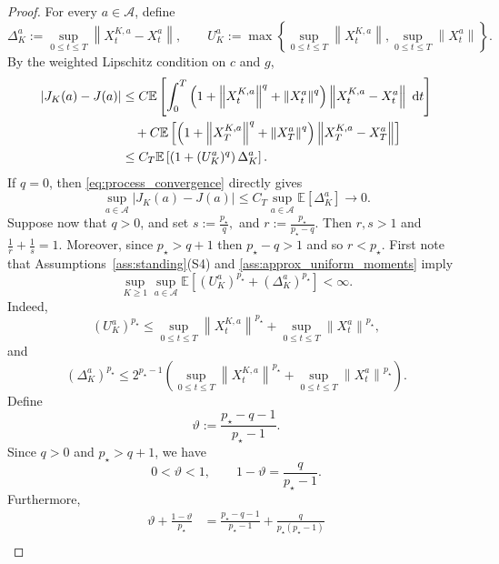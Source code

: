 \documentclass[11pt]{article}
\theoremstyle{remarkitalic}
\theoremstyle{remarkitalic}
\newcommand{\E}{\mathbb E}
\newcommand{\dd}{\,\mathrm d}
\newcommand{\1}{\mathbf 1}
\newcommand{\norm}[1]{\left\lVert #1 \right\rVert}
\newcommand{\abs}[1]{\left\lvert #1\right\rvert}
\begin{document}
{\begin{proof}
For every $a\in\mathcal A$, define
\[
    \Delta_K^a
    :=
    \sup_{0\le t\le T}
    \norm{X_t^{K,a}-X_t^a},
    \qquad
    U_K^a
    :=
    \max\left\{
        \sup_{0\le t\le T}\norm{X_t^{K,a}},
        \sup_{0\le t\le T}\norm{X_t^a}
    \right\}.
\]
By the weighted Lipschitz condition on $c$ and $g$,
\begin{align}
    \abs{J_K(a)-J(a)}
    &\le
    C
    \E\left[
        \int_0^T
        \left(
            1+\norm{X_t^{K,a}}^q+\norm{X_t^a}^q
        \right)
        \norm{X_t^{K,a}-X_t^a}
        \,\dd t
    \right]
    \notag\\
    &\quad
    +
    C
    \E\left[
        \left(
            1+\norm{X_T^{K,a}}^q+\norm{X_T^a}^q
        \right)
        \norm{X_T^{K,a}-X_T^a}
    \right]
    \notag\\
    &\le
    C_T
    \E\left[
        \left(
            1+(U_K^a)^q
        \right)
        \Delta_K^a
    \right].
    \label{eq:cost_error_interpolation}
\end{align} If $q=0$, then \eqref{eq:process_convergence} directly gives
\[
    \sup_{a\in\mathcal A}
    \abs{J_K(a)-J(a)}
    \le
    C_T
    \sup_{a\in\mathcal A}
    \E[\Delta_K^a]
    \longrightarrow0.
\] Suppose now that $q>0$, and set
$    s:=\frac{p_\star}{q},$ and $
    r:=\frac{p_\star}{p_\star-q}.$
Then $r,s>1$ and $
    \frac1r+\frac1s=1.$
Moreover, since $
    p_\star>q+1$ then
    $p_\star-q>1$ and so $
    r<p_\star.$ First note that Assumptions~\ref{ass:standing}(S4) and
\ref{ass:approx_uniform_moments} imply
\begin{equation}
\label{eq:uniform-U-Delta-moments}
    \sup_{K\ge1}\sup_{a\in\mathcal A}
    \E\left[
        (U_K^a)^{p_\star}
        +
        (\Delta_K^a)^{p_\star}
    \right]
    <\infty.
\end{equation}
Indeed,
\[
    (U_K^a)^{p_\star}
    \le
    \sup_{0\le t\le T}\norm{X_t^{K,a}}^{p_\star}
    +
    \sup_{0\le t\le T}\norm{X_t^a}^{p_\star},
\]
and
\[
    (\Delta_K^a)^{p_\star}
    \le
    2^{p_\star-1}
    \left(
        \sup_{0\le t\le T}\norm{X_t^{K,a}}^{p_\star}
        +
        \sup_{0\le t\le T}\norm{X_t^a}^{p_\star}
    \right).
\]  Define
\[
    \vartheta
    :=
    \frac{p_\star-q-1}{p_\star-1}.
\]
Since $q>0$ and $p_\star>q+1$, we have
\[
    0<\vartheta<1,
    \qquad
    1-\vartheta
    =
    \frac{q}{p_\star-1}.
\]
Furthermore,
\begin{align*}
    \vartheta+\frac{1-\vartheta}{p_\star}
    &=
    \frac{p_\star-q-1}{p_\star-1}
    +
    \frac{q}{p_\star(p_\star-1)}\\

\end{align*}
\end{proof}}
\end{document}
